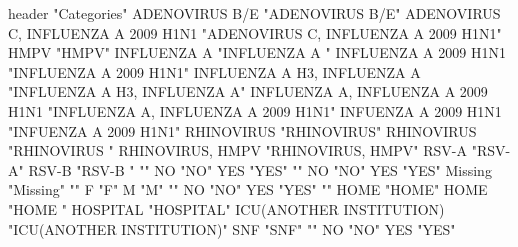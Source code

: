 \documentclass{article}\usepackage[]{graphicx}\usepackage[]{color}
\begin{document}
header                              "Categories"                         
ADENOVIRUS B/E                      "ADENOVIRUS B/E"                     
ADENOVIRUS C, INFLUENZA A 2009 H1N1 "ADENOVIRUS C, INFLUENZA A 2009 H1N1"
HMPV                                "HMPV"                               
INFLUENZA A                         "INFLUENZA A "                       
INFLUENZA A 2009 H1N1               "INFLUENZA A 2009 H1N1"              
INFLUENZA A H3, INFLUENZA A         "INFLUENZA A H3, INFLUENZA A"        
INFLUENZA A, INFLUENZA A 2009 H1N1  "INFLUENZA A, INFLUENZA A 2009 H1N1" 
INFUENZA A 2009 H1N1                "INFUENZA A 2009 H1N1"               
RHINOVIRUS                          "RHINOVIRUS"                         
RHINOVIRUS                          "RHINOVIRUS "                        
RHINOVIRUS, HMPV                    "RHINOVIRUS, HMPV"                   
RSV-A                               "RSV-A"                              
RSV-B                               "RSV-B "                             
                                    ""                                   
NO                                  "NO"                                 
YES                                 "YES"                                
                                    ""                                   
NO                                  "NO"                                 
YES                                 "YES"                                
Missing                             "Missing"                            
                                    ""                                   
F                                   "F"                                  
M                                   "M"                                  
                                    ""                                   
NO                                  "NO"                                 
YES                                 "YES"                                
                                    ""                                   
HOME                                "HOME"                               
HOME                                "HOME "                              
HOSPITAL                            "HOSPITAL"                           
ICU(ANOTHER INSTITUTION)            "ICU(ANOTHER INSTITUTION)"           
SNF                                 "SNF"                                
                                    ""                                   
NO                                  "NO"                                 
YES                                 "YES"                                
\end{document}
